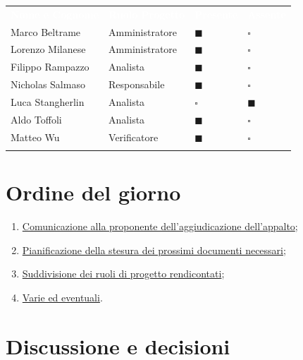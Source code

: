 \documentclass[12pt,a4paper]{article}
\newcommand{\tightlist}{\setlength{\itemsep}{1pt}\setlength{\parskip}{0pt}}
\begin{document}
\begin{center}
\begin{tabularx}{\linewidth}{>{\raggedright\arraybackslash}X>{\centering\arraybackslash}X>{\centering\arraybackslash}p{2.2cm}>{\centering\arraybackslash}p{2.2cm}}
\rowcolor{bfblue}\textcolor{white}{\textbf{Nome e Cognome}} & \textcolor{white}{\textbf{Ruolo Progetto}} & \textcolor{white}{\textbf{Presente}} & \textcolor{white}{\textbf{Assente}} \\
Marco Beltrame & Amministratore & $\blacksquare$ & $\square$ \\ \arrayrulecolor{bfline}\hline
Lorenzo Milanese & Amministratore & $\blacksquare$ & $\square$ \\ \arrayrulecolor{bfline}\hline
Filippo Rampazzo & Analista & $\blacksquare$ & $\square$ \\ \arrayrulecolor{bfline}\hline
Nicholas Salmaso & Responsabile & $\blacksquare$ & $\square$ \\ \arrayrulecolor{bfline}\hline
Luca Stangherlin & Analista & $\square$ & $\blacksquare$ \\ \arrayrulecolor{bfline}\hline
Aldo Toffoli & Analista & $\blacksquare$ & $\square$ \\ \arrayrulecolor{bfline}\hline
Matteo Wu & Verificatore & $\blacksquare$ & $\square$ \\ \arrayrulecolor{bfline}\hline
\end{tabularx}
\end{center}

\hypertarget{ordine-del-giorno}{%
\section{Ordine del giorno}}

\begin{enumerate}
\tightlist
\item \hyperlink{odg-1}{Comunicazione alla proponente dell'aggiudicazione dell'appalto};
\item \hyperlink{odg-2}{Pianificazione della stesura dei prossimi documenti necessari};
\item \hyperlink{odg-3}{Suddivisione dei ruoli di progetto rendicontati};
\item \hyperlink{varie-ed-eventuali}{Varie ed eventuali}.
\end{enumerate}


\newpage
\hypertarget{discussione-e-decisioni}{%
\section{Discussione e decisioni}}
\end{document}
